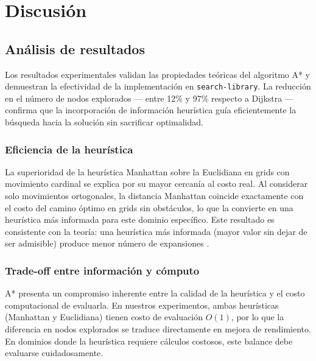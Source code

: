 \section{Discusión}

\subsection{Análisis de resultados}

Los resultados experimentales validan las propiedades teóricas del algoritmo A* y demuestran la efectividad de la implementación en \texttt{search-library}. La reducción en el número de nodos explorados --- entre 12\% y 97\% respecto a Dijkstra --- confirma que la incorporación de información heurística guía eficientemente la búsqueda hacia la solución sin sacrificar optimalidad.

\subsubsection{Eficiencia de la heurística}

La superioridad de la heurística Manhattan sobre la Euclidiana en grids con movimiento cardinal se explica por su mayor cercanía al costo real. Al considerar solo movimientos ortogonales, la distancia Manhattan coincide exactamente con el costo del camino óptimo en grids sin obstáculos, lo que la convierte en una heurística más informada para este dominio específico. Este resultado es consistente con la teoría: una heurística más informada (mayor valor sin dejar de ser admisible) produce menor número de expansiones \cite{pearl1984heuristics}.

\subsubsection{Trade-off entre información y cómputo}

A* presenta un compromiso inherente entre la calidad de la heurística y el costo computacional de evaluarla. En nuestros experimentos, ambas heurísticas (Manhattan y Euclidiana) tienen costo de evaluación $O(1)$, por lo que la diferencia en nodos explorados se traduce directamente en mejora de rendimiento. En dominios donde la heurística requiere cálculos costosos, este balance debe evaluarse cuidadosamente.

